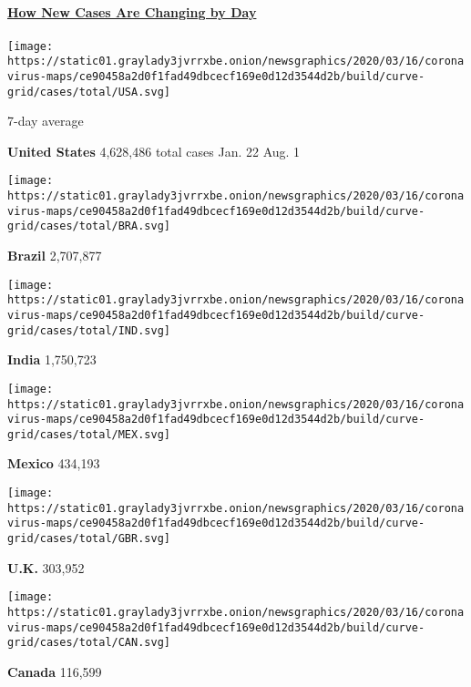 \subsection{}

\hypertarget{how-new-cases-are-changing-by-day}{%
\paragraph{\texorpdfstring{\href{https://www.nytimes3xbfgragh.onion/interactive/2020/world/coronavirus-maps.html}{How
New Cases Are Changing by
Day}}{How New Cases Are Changing by Day}}\label{how-new-cases-are-changing-by-day}}

\texttt{[image: https://static01.graylady3jvrrxbe.onion/newsgraphics/2020/03/16/coronavirus-maps/ce90458a2d0f1fad49dbcecf169e0d12d3544d2b/build/curve-grid/cases/total/USA.svg]}

7-day average

\textbf{United States} 4,628,486 total cases Jan. 22 Aug. 1

\texttt{[image: https://static01.graylady3jvrrxbe.onion/newsgraphics/2020/03/16/coronavirus-maps/ce90458a2d0f1fad49dbcecf169e0d12d3544d2b/build/curve-grid/cases/total/BRA.svg]}

\textbf{Brazil} 2,707,877

\texttt{[image: https://static01.graylady3jvrrxbe.onion/newsgraphics/2020/03/16/coronavirus-maps/ce90458a2d0f1fad49dbcecf169e0d12d3544d2b/build/curve-grid/cases/total/IND.svg]}

\textbf{India} 1,750,723

\texttt{[image: https://static01.graylady3jvrrxbe.onion/newsgraphics/2020/03/16/coronavirus-maps/ce90458a2d0f1fad49dbcecf169e0d12d3544d2b/build/curve-grid/cases/total/MEX.svg]}

\textbf{Mexico} 434,193

\texttt{[image: https://static01.graylady3jvrrxbe.onion/newsgraphics/2020/03/16/coronavirus-maps/ce90458a2d0f1fad49dbcecf169e0d12d3544d2b/build/curve-grid/cases/total/GBR.svg]}

\textbf{U.K.} 303,952

\texttt{[image: https://static01.graylady3jvrrxbe.onion/newsgraphics/2020/03/16/coronavirus-maps/ce90458a2d0f1fad49dbcecf169e0d12d3544d2b/build/curve-grid/cases/total/CAN.svg]}

\textbf{Canada} 116,599

\href{https://www.nytimes3xbfgragh.onion/interactive/2020/world/coronavirus-maps.html}{}


